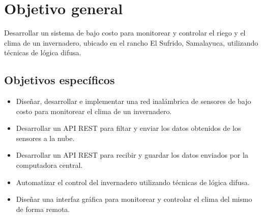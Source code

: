 \section{Objetivo general}
Desarrollar un sistema de bajo costo para monitorear y controlar el riego y el clima de un invernadero, ubicado en el rancho El Sufrido, Samalayuca, utilizando técnicas de lógica difusa.

\subsection{Objetivos específicos}
\begin{itemize}
	\item Diseñar, desarrollar e implementar una red inalámbrica de sensores de bajo costo para monitorear el clima de un invernadero.
	\item Desarrollar un API REST para filtar y enviar los datos obtenidos de los sensores a la nube.
	\item Desarrollar un API REST para recibir y guardar los datos enviados por la computadora central.
	\item Automatizar el control del invernadero utilizando técnicas de lógica difusa.
	\item Diseñar una interfaz gráfica para monitorear y controlar el clima del mismo de forma remota.
\end{itemize}